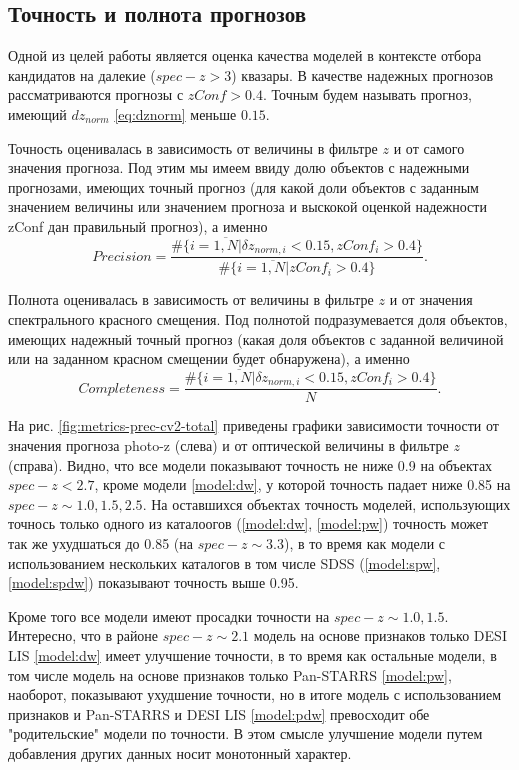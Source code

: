 \documentclass[fleqn,usenatbib]{mnras}
\begin{document}
\subsection{Точность и полнота прогнозов}\label{ssec:precision-and-completeness}

Одной из целей работы является оценка качества моделей в контексте отбора кандидатов на далекие ($spec-z > 3$) квазары. В качестве надежных прогнозов рассматриваются прогнозы с $zConf > 0.4$. Точным будем называть прогноз, имеющий $dz_{norm}$ \eqref{eq:dznorm} меньше $0.15$.

Точность оценивалась в зависимость от величины в фильтре $z$ и от самого значения прогноза. Под этим мы имеем ввиду долю объектов с надежными прогнозами, имеющих точный прогноз (для какой доли объектов с заданным значением величины или значением прогноза и выскокой оценкой надежности zConf дан правильный прогноз), а именно \begin{equation}\label{eq:precision}
    Precision = \frac{\#\{i = \overline{1, N} | \delta z_{norm, i} < 0.15, zConf_i > 0.4\}}{\#\{i = \overline{1, N} | zConf_i > 0.4\}}.
\end{equation}

Полнота оценивалась в зависимость от величины в фильтре $z$ и от значения спектрального красного смещения. Под полнотой подразумевается доля объектов, имеющих надежный точный прогноз (какая доля объектов с заданной величиной или на заданном красном смещении будет обнаружена), а именно \begin{equation}\label{eq:completeness}
    Completeness = \frac{\#\{i = \overline{1, N} | \delta z_{norm, i} < 0.15, zConf_i > 0.4\}}{N}.
\end{equation}

На рис. \ref{fig:metrics-prec-cv2-total} приведены графики зависимости точности от значения прогноза photo-z (слева) и от оптической величины в фильтре $z$ (справа). Видно, что все модели показывают точность не ниже 0.9 на объектах $spec-z < 2.7$, кроме модели \ref{model:dw}, у которой точность падает ниже 0.85 на $spec-z \sim 1.0, 1.5, 2.5$. На оставшихся объектах точность моделей, использующих точнось только одного из каталоогов (\ref{model:dw}, \ref{model:pw}) точность может так же ухудшаться до 0.85 (на $spec-z \sim 3.3$), в то время как модели с использованием нескольких каталогов в том числе SDSS (\ref{model:spw}, \ref{model:spdw}) показывают точность выше 0.95.

Кроме того все модели имеют просадки точности на $spec-z \sim 1.0, 1.5$. Интересно, что в районе $spec-z \sim 2.1$ модель на основе признаков только DESI LIS \ref{model:dw} имеет улучшение точности, в то время как остальные модели, в том числе модель на основе признаков только Pan-STARRS \ref{model:pw}, наоборот, показывают ухудшение точности, но в итоге модель с использованием признаков и Pan-STARRS и DESI LIS \ref{model:pdw} превосходит обе "родительские" модели по точности. В этом смысле улучшение модели путем добавления других данных носит монотонный характер.
\end{document}
